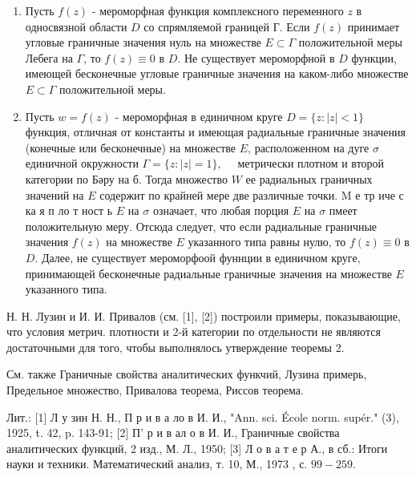 \documentclass[10pt]{article}
\begin{document}
\begin{enumerate}

  \item Пусть $f(z)$ - мероморфная функция комплексного переменного $z$ в односвязной области $D$ со спрямляемой границей Г. Если $f(z)$ принимает угловые граничные значения нуль на множестве $E \subset \Gamma$ положительной меры Лебега на $\Gamma$, то $f(z) \equiv 0$ в $D$. Не существует мероморфной в $D$ функции, имеющей бесконечные угловые граничные значения на каком-либо множестве $E \subset \Gamma$ положительной меры.



  \item Пусть $w=f(z)$ - мероморфная в единичном круге $D=\{z:|z|<1\}$ функция, отличная от константы и имеющая радиальные граничные значения (конечные или бесконечные) на множестве $E$, расположенном на дуге $\sigma$ единичной окружности $\Gamma=\{z:|z|=1\}, \quad$ метрически плотном и второй категории по Бәру на б. Тогда множество $W$ ее радиальных граничных значений на $E$ содержит по крайней мере две различные точки. $\mathrm{M}$ е тр иче с ка я п ло т ност ь $E$ на $\sigma$ означает, что любая порция $E$ на $\sigma$ пмеет положительную меру. Отсюда следует, что если радиальные граничные значения $f(z)$ на множестве $E$ указанного типа равны нулю, то $f(z) \equiv 0$ в $D$. Далее, не существует мероморфоой фуннции в единичном круге, принимающей бесконечные радиальные граничные значения на множестве $E$ указанного типа.



\end{enumerate}



Н. Н. Лузин и И. И. Привалов (см. [1], [2]) построили примеры, показывающие, что условия метрич. плотности и 2-й категории по отдельности не являются достаточными для того, чтобы выполнялось утверждение теоремы 2.



См. также Граничные свойства аналитических функчий, Лузина примерь, Предельное множество, Привалова теорема, Риссов теорема.



Лит.: [1] Л у зин Н. Н., П р и в а ло в И. И., "Ann. sci. École norm. supér." (3), 1925, t. 42, p. 143-91; [2] П' р и в ал о в И. И., Граничные свойства аналитических функций, 2 изд., М. Л., 1950; [3] Л о в а т е р А., в сб.: Итоги науки и техники. Математический анализ, т. 10, М., 1973 , с. $99-259$.
\end{document}
